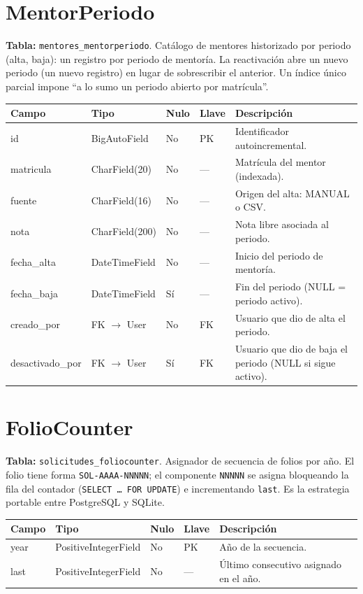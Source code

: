 \documentclass[12pt,letterpaper]{report}
\begin{document}
\section{MentorPeriodo}

\textbf{Tabla:} \texttt{mentores\_mentorperiodo}. Catálogo de mentores
historizado por periodo (alta, baja): un registro por periodo de mentoría. La
reactivación abre un nuevo periodo (un nuevo registro) en lugar de sobrescribir
el anterior. Un índice único parcial impone ``a lo sumo un periodo abierto por
matrícula''.

\begin{longtable}{L{2.9cm} L{2.6cm} C{1.0cm} C{1.0cm} L{6.6cm}}
\toprule
\textbf{Campo} & \textbf{Tipo} & \textbf{Nulo} & \textbf{Llave} & \textbf{Descripción} \\
\midrule
\endhead
id & BigAutoField & No & PK & Identificador autoincremental. \\
matricula & CharField(20) & No & --- & Matrícula del mentor (indexada). \\
fuente & CharField(16) & No & --- & Origen del alta: MANUAL o CSV. \\
nota & CharField(200) & No & --- & Nota libre asociada al periodo. \\
fecha\_alta & DateTimeField & No & --- & Inicio del periodo de mentoría. \\
fecha\_baja & DateTimeField & Sí & --- & Fin del periodo (NULL = periodo activo). \\
creado\_por & FK $\rightarrow$ User & No & FK & Usuario que dio de alta el periodo. \\
desactivado\_por & FK $\rightarrow$ User & Sí & FK & Usuario que dio de baja el periodo (NULL si sigue activo). \\
\bottomrule
\end{longtable}

\section{FolioCounter}

\textbf{Tabla:} \texttt{solicitudes\_foliocounter}. Asignador de secuencia de
folios por año. El folio tiene forma \texttt{SOL-AAAA-NNNNN}; el componente
\texttt{NNNNN} se asigna bloqueando la fila del contador
(\texttt{SELECT \dots\ FOR UPDATE}) e incrementando \texttt{last}. Es la
estrategia portable entre PostgreSQL y SQLite.

\begin{longtable}{L{2.9cm} L{2.6cm} C{1.0cm} C{1.0cm} L{6.6cm}}
\toprule
\textbf{Campo} & \textbf{Tipo} & \textbf{Nulo} & \textbf{Llave} & \textbf{Descripción} \\
\midrule
\endhead
year & PositiveIntegerField & No & PK & Año de la secuencia. \\
last & PositiveIntegerField & No & --- & Último consecutivo asignado en el año. \\
\bottomrule
\end{longtable}
\end{document}
